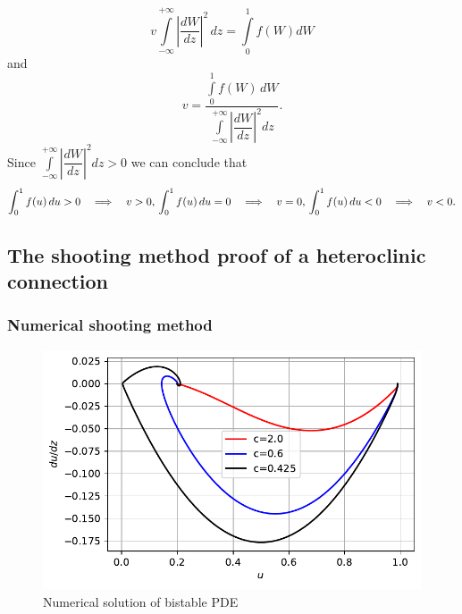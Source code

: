 \documentclass[
  letterpaper,
  DIV=11,
  numbers=noendperiod]{scrreprt}
\theoremstyle{definition}
\theoremstyle{plain}
\theoremstyle{plain}
\theoremstyle{remark}
\begin{document}
\[
 v\int\limits_{-\infty}^{+ \infty} \left|\dfrac{dW}{dz} \right|^2\, dz  =  \int\limits_{0}^{1}f(W) dW 
\] and \[
 v= \dfrac {\int\limits_{0}^{1}f(W) \, dW}{\int\limits_{-\infty}^{+ \infty} \left|\dfrac{dW}{dz} \right|^2 dz}.
\] Since
\(\int\limits_{-\infty}^{+ \infty} \left|\dfrac{dW}{dz} \right|^2 dz >0\)
we can conclude that \[
 \int_{0}^{1}f(u) \, du > 0  \quad  \Longrightarrow  \quad v> 0, \\
  \int_{0}^{1}f(u) \, du =0 \quad  \Longrightarrow  \quad v=0, \\
   \int_{0}^{1}f(u) \, du < 0  \quad  \Longrightarrow \quad v < 0. 
\]

\hypertarget{the-shooting-method-proof-of-a-heteroclinic-connection}{%
\subsection{The shooting method proof of a heteroclinic
connection}\label{the-shooting-method-proof-of-a-heteroclinic-connection}}

\hypertarget{numerical-shooting-method}{%
\subsubsection{Numerical shooting
method}\label{numerical-shooting-method}}

\begin{figure}

{\centering \includegraphics{nonlinearreactiondiffusion_files/figure-pdf/fig-bistablenumtravwave-output-1.pdf}

}

\caption{\label{fig-bistablenumtravwave}Numerical solution of bistable
PDE}

\end{figure}
\end{document}
